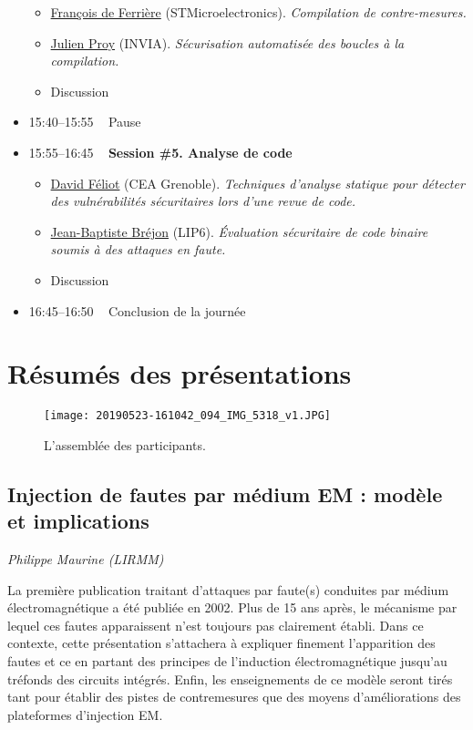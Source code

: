 \documentclass[a4paper,11pt]{article}
\begin{document}
\begin{itemize}
\begin{itemize}
\item \hyperref[sec:org3cd223f]{François de Ferrière} (STMicroelectronics). \emph{Compilation de contre-mesures.}
\item \hyperref[sec:org41b4c9c]{Julien Proy} (INVIA). \emph{Sécurisation automatisée des boucles à la compilation.}
\item Discussion
\end{itemize}
\item 15:40--15:55   Pause
\item 15:55--16:45   \textbf{Session \#5. Analyse de code}
\begin{itemize}
\item \hyperref[sec:org75eef01]{David Féliot} (CEA Grenoble). \emph{Techniques d’analyse statique pour détecter des vulnérabilités sécuritaires lors d’une revue de code.}
\item \hyperref[sec:orgd2a7b7d]{Jean-Baptiste Bréjon} (LIP6). \emph{Évaluation sécuritaire de code binaire soumis à des attaques en faute.}
\item Discussion
\end{itemize}
\item 16:45--16:50   Conclusion de la journée
\end{itemize}

\section{Résumés des présentations}
\label{sec:org952152d}
\begin{figure}[t]
\centering
\texttt{[image: 20190523-161042\_094\_IMG\_5318\_v1.JPG]}
\caption{L'assemblée des participants.}
\end{figure}

\subsection{Injection de fautes par médium EM : modèle et implications}
\label{sec:org0856570}
\emph{Philippe Maurine (LIRMM)}

La première publication traitant d’attaques par faute(s) conduites par
médium électromagnétique a été publiée en 2002. Plus de 15 ans après,
le mécanisme par lequel ces fautes apparaissent n’est toujours pas
clairement établi. Dans ce contexte, cette présentation s’attachera à
expliquer finement l’apparition des fautes et ce en partant des
principes de l’induction électromagnétique jusqu’au tréfonds des
circuits intégrés. Enfin, les enseignements de ce modèle seront tirés
tant pour établir des pistes de contremesures que des moyens
d’améliorations des plateformes d’injection EM.
\end{document}
